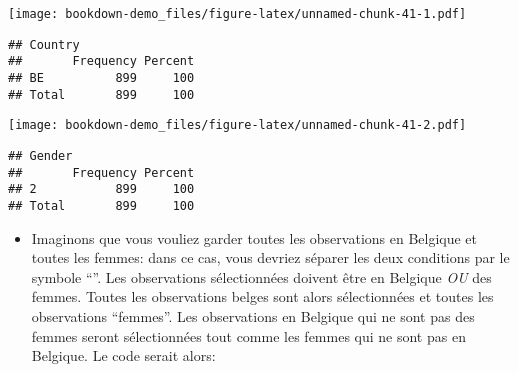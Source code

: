 \documentclass[
]{book}
\newenvironment{Shaded}{\begin{snugshade}}{\end{snugshade}}
\newcommand{\CommentTok}[1]{\textcolor[rgb]{0.56,0.35,0.01}{\textit{#1}}}
\newcommand{\DecValTok}[1]{\textcolor[rgb]{0.00,0.00,0.81}{#1}}
\newcommand{\FunctionTok}[1]{\textcolor[rgb]{0.00,0.00,0.00}{#1}}
\newcommand{\NormalTok}[1]{#1}
\newcommand{\OtherTok}[1]{\textcolor[rgb]{0.56,0.35,0.01}{#1}}
\newcommand{\SpecialCharTok}[1]{\textcolor[rgb]{0.00,0.00,0.00}{#1}}
\newcommand{\StringTok}[1]{\textcolor[rgb]{0.31,0.60,0.02}{#1}}
\providecommand{\tightlist}{%
  \setlength{\itemsep}{0pt}\setlength{\parskip}{0pt}}
\begin{document}
\begin{Shaded}
\end{Shaded}

\texttt{[image: bookdown-demo\_files/figure-latex/unnamed-chunk-41-1.pdf]}

\begin{verbatim}
## Country 
##       Frequency Percent
## BE          899     100
## Total       899     100
\end{verbatim}

\begin{Shaded}
\end{Shaded}

\texttt{[image: bookdown-demo\_files/figure-latex/unnamed-chunk-41-2.pdf]}

\begin{verbatim}
## Gender 
##       Frequency Percent
## 2           899     100
## Total       899     100
\end{verbatim}

\begin{itemize}
\tightlist
\item
  Imaginons que vous vouliez garder toutes les observations en Belgique et toutes les femmes: dans ce cas, vous devriez séparer les deux conditions par le symbole ``\textbar{}''. Les observations sélectionnées doivent être en Belgique \emph{OU} des femmes. Toutes les observations belges sont alors sélectionnées et toutes les observations ``femmes''. Les observations en Belgique qui ne sont pas des femmes seront sélectionnées tout comme les femmes qui ne sont pas en Belgique. Le code serait alors:
\end{itemize}

\begin{Shaded}
\end{Shaded}
\end{document}
